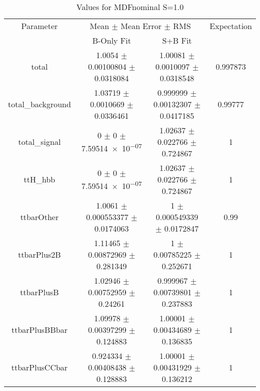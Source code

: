 \begin{table}
\centering
\caption{Values for MDFnominal S=1.0}
\begin{tabular}{cccc}
\toprule
Parameter & \multicolumn{2}{c}{Mean $\pm$ Mean Error $\pm$ RMS} & Expectation\\
 & B-Only Fit & S+B Fit & \\
\midrule
total & \num{1.0054} $\pm$ \num{0.00100804} $\pm$ \num{0.0318084} & \num{1.00081} $\pm$ \num{0.0010097} $\pm$ \num{0.0318548} & \num{0.997873}\\
total\_background & \num{1.03719} $\pm$ \num{0.0010669} $\pm$ \num{0.0336461} & \num{0.999999} $\pm$ \num{0.00132307} $\pm$ \num{0.0417185} & \num{0.99777}\\
total\_signal & \num{0} $\pm$ \num{0} $\pm$ \num{7.59514e-07} & \num{1.02637} $\pm$ \num{0.022766} $\pm$ \num{0.724867} & \num{1}\\
ttH\_hbb & \num{0} $\pm$ \num{0} $\pm$ \num{7.59514e-07} & \num{1.02637} $\pm$ \num{0.022766} $\pm$ \num{0.724867} & \num{1}\\
ttbarOther & \num{1.0061} $\pm$ \num{0.000553377} $\pm$ \num{0.0174063} & \num{1} $\pm$ \num{0.000549339} $\pm$ \num{0.0172847} & \num{0.99}\\
ttbarPlus2B & \num{1.11465} $\pm$ \num{0.00872969} $\pm$ \num{0.281349} & \num{1} $\pm$ \num{0.00785225} $\pm$ \num{0.252671} & \num{1}\\
ttbarPlusB & \num{1.02946} $\pm$ \num{0.00752959} $\pm$ \num{0.24261} & \num{0.999967} $\pm$ \num{0.00739801} $\pm$ \num{0.237883} & \num{1}\\
ttbarPlusBBbar & \num{1.09978} $\pm$ \num{0.00397299} $\pm$ \num{0.124883} & \num{1.00001} $\pm$ \num{0.00434689} $\pm$ \num{0.136835} & \num{1}\\
ttbarPlusCCbar & \num{0.924334} $\pm$ \num{0.00408438} $\pm$ \num{0.128883} & \num{1.00001} $\pm$ \num{0.00431929} $\pm$ \num{0.136212} & \num{1}\\
\bottomrule
\end{tabular}
\end{table}